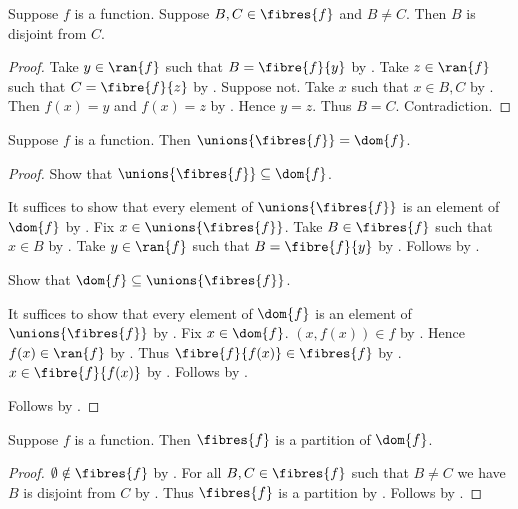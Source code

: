 \begin{proposition}\label{distinct_function_fibres_disjoint}
    Suppose $f$ is a function.
    Suppose $B,C\in\fibres{f}$ and $B\neq C$.
    Then $B$ is disjoint from $C$.
\end{proposition}
\begin{proof}
    Take $y\in\ran{f}$ such that $B=\fibre{f}{y}$
        by .
    Take $z\in\ran{f}$ such that $C=\fibre{f}{z}$
        by .
    Suppose not.
    Take $x$ such that $x\in B,C$ by .
    Then $f(x)=y$ and $f(x)=z$ by .
    Hence $y=z$.
    Thus $B=C$.
    Contradiction.
\end{proof}

\begin{proposition}\label{function_fibres_cover_domain}
    Suppose $f$ is a function.
    Then $\unions{\fibres{f}}=\dom{f}$.
\end{proposition}
\begin{proof}
    Show that $\unions{\fibres{f}}\subseteq\dom{f}$.
    \begin{subproof}
        It suffices to show that every element of $\unions{\fibres{f}}$
            is an element of $\dom{f}$ by .
        Fix $x\in\unions{\fibres{f}}$.
        Take $B\in\fibres{f}$ such that $x\in B$ by .
        Take $y\in\ran{f}$ such that $B=\fibre{f}{y}$
            by .
        Follows by .
    \end{subproof}
    Show that $\dom{f}\subseteq\unions{\fibres{f}}$.
    \begin{subproof}
        It suffices to show that every element of $\dom{f}$
            is an element of $\unions{\fibres{f}}$ by .
        Fix $x\in\dom{f}$.
        $(x,f(x))\in f$ by .
        Hence $f(x)\in\ran{f}$ by .
        Thus $\fibre{f}{f(x)}\in\fibres{f}$
            by .
        $x\in\fibre{f}{f(x)}$ by .
        Follows by .
    \end{subproof}
    Follows by .
\end{proof}

\begin{theorem}\label{function_fibres_partition}
    Suppose $f$ is a function.
    Then $\fibres{f}$ is a partition of $\dom{f}$.
\end{theorem}
\begin{proof}
    $\emptyset\notin\fibres{f}$ by .
    For all $B,C\in\fibres{f}$ such that $B\neq C$
        we have $B$ is disjoint from $C$
        by .
    Thus $\fibres{f}$ is a partition by .
    Follows by .
\end{proof}

